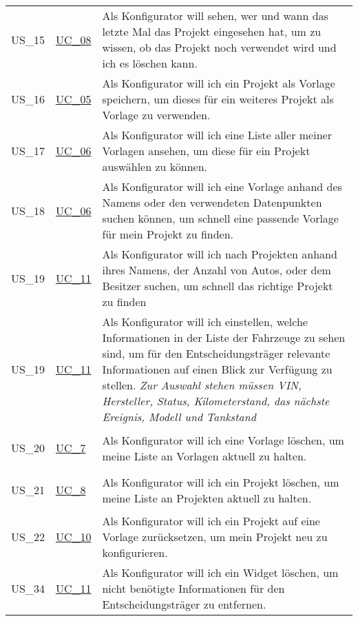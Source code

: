 \begin{footnotesize}
\begin{longtable}[L L L]{ p{} p{} p{} }
      \hypertarget{Ref:US15}{US\_15} & \hyperlink{Ref:UC8}{UC\_08} & Als Konfigurator will sehen, wer und wann das letzte Mal das Projekt eingesehen hat, um zu wissen, ob das Projekt noch verwendet wird und ich es löschen kann. \\
      \hypertarget{Ref:US16}{US\_16} & \hyperlink{Ref:UC5}{UC\_05} & Als Konfigurator will ich ein Projekt als Vorlage speichern, um dieses für ein weiteres Projekt als Vorlage zu verwenden. \\
      \hypertarget{Ref:US17}{US\_17} & \hyperlink{Ref:UC6}{UC\_06} & Als Konfigurator will ich eine Liste aller meiner Vorlagen ansehen, um diese für ein Projekt auswählen zu können. \\
      \hypertarget{Ref:US18}{US\_18} & \hyperlink{Ref:UC6}{UC\_06} & Als Konfigurator will ich eine Vorlage anhand des Namens oder den verwendeten Datenpunkten suchen können, um schnell eine passende Vorlage für mein Projekt zu finden. \\
      \hypertarget{Ref:US19}{US\_19} & \hyperlink{Ref:UC11}{UC\_11} & Als Konfigurator will ich nach Projekten anhand ihres Namens, der Anzahl von Autos, oder dem Besitzer suchen, um schnell das richtige Projekt zu finden \\
      \hypertarget{Ref:US19}{US\_19} & \hyperlink{Ref:UC11}{UC\_11} & Als Konfigurator will ich einstellen, welche Informationen in der Liste der Fahrzeuge zu sehen sind, um für den Entscheidungsträger relevante Informationen auf einen Blick zur Verfügung zu stellen.
      \newline\newline
      \emph{Zur Auswahl stehen müssen VIN, Hersteller, Status, Kilometerstand, das nächste Ereignis, Modell und Tankstand} \\
      \hypertarget{Ref:US20}{US\_20} & \hyperlink{Ref:UC7}{UC\_7} & Als Konfigurator will ich eine Vorlage löschen, um meine Liste an Vorlagen aktuell zu halten. \\
      \hypertarget{Ref:US21}{US\_21} & \hyperlink{Ref:UC8}{UC\_8} & Als Konfigurator will ich ein Projekt löschen, um meine Liste an Projekten aktuell zu halten. \\
      \hypertarget{Ref:US22}{US\_22} & \hyperlink{Ref:UC10}{UC\_10} & Als Konfigurator will ich ein Projekt auf eine Vorlage zurücksetzen, um mein Projekt neu zu konfigurieren. \\
      \hypertarget{Ref:US34}{US\_34} & \hyperlink{Ref:UC11}{UC\_11} & Als Konfigurator will ich ein Widget löschen, um nicht benötigte Informationen für den Entscheidungsträger zu entfernen. \\

\end{longtable}
\end{footnotesize}
